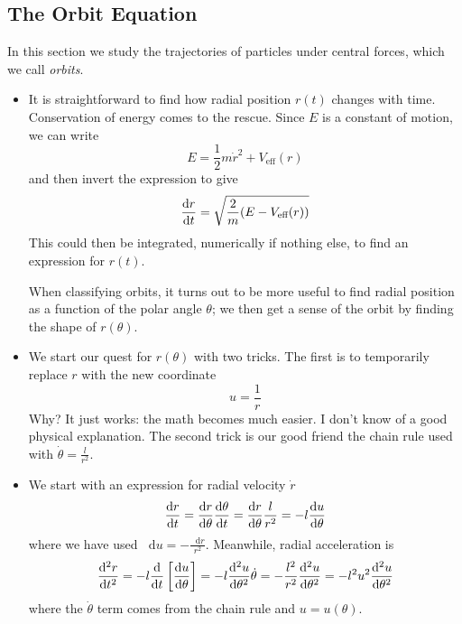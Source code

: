 \documentclass[11pt, a4paper]{article}
\newcommand{\diff}{\mathop{}\!\mathrm{d}} %
\newcommand{\veff}{V_{\text{eff}}}  %
\begin{document}
\subsection{The Orbit Equation}
In this section we study the trajectories of particles under central forces, which we call \textit{orbits}.
\begin{itemize}
	\item It is straightforward to find how radial position $ r(t) $ changes with time. Conservation of energy comes to the rescue. Since $ E $ is a constant of motion, we can write
	\begin{equation*}
		E = \frac{1}{2}m \dot{r}^{2} + \veff(r)
	\end{equation*}
	and then invert the expression to give
	\begin{equation*}
		\dv{r}{t} = \sqrt{\frac{2}{m}(E - \veff(r))}
	\end{equation*}
	This could then be integrated, numerically if nothing else, to find an expression for $ r(t) $. 
	
	When classifying orbits, it turns out to be more useful to find radial position as a function of the polar angle $ \theta $; we then get a sense of the orbit by finding the shape of $ r(\theta) $.
	
	\item We start our quest for $ r(\theta) $ with two tricks. The first is to temporarily replace $ r $ with the new coordinate
	\begin{equation*}
		u = \frac{1}{r}
	\end{equation*}
	Why? It just works: the math becomes much easier. I don't know of a good physical explanation. The second trick is our good friend the chain rule used with $ \dot{\theta} = \frac{l}{r^{2}} $. 
	
	\item We start with an expression for radial velocity $ \dot{r} $
	\begin{equation*}
		\dv{r}{t} = \dv{r}{\theta} \dv{\theta}{t} =  \dv{r}{\theta}  \frac{l}{r^{2}} = - l \dv{u}{\theta}
	\end{equation*}
	where we have used $ \diff u = -\frac{\diff r}{r^{2}} $. Meanwhile, radial acceleration is
	\begin{equation*}
		\dv[2]{r}{t} = - l \dv{}{t}\left[\dv{u}{\theta}\right] = - l \dv[2]{u}{\theta} \dot{\theta} = -\frac{l^{2}}{r^{2}} \dv[2]{u}{\theta} = -l^{2}u^{2}\dv[2]{u}{\theta} 
	\end{equation*}
	where the $ \dot{\theta} $ term comes from the chain rule and $ u = u(\theta) $.
	

\end{itemize}
\end{document}
